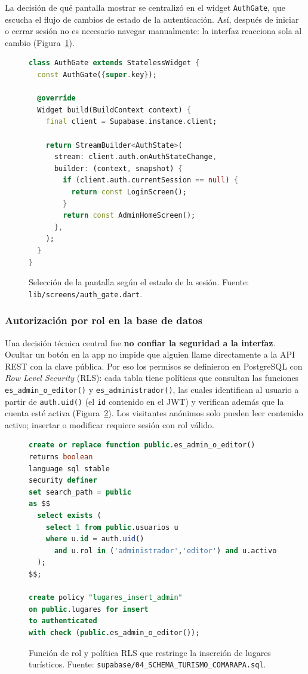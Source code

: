 La decisión de qué pantalla mostrar se centralizó en el widget
\texttt{AuthGate}, que escucha el flujo de cambios de estado de la
autenticación. Así, después de iniciar o cerrar sesión no es necesario
navegar manualmente: la interfaz reacciona sola al cambio
(Figura~\ref{fig:impl-authgate}).

\begin{figure}[H]
\begin{lstlisting}[style=codigo,language=Dart]
class AuthGate extends StatelessWidget {
  const AuthGate({super.key});

  @override
  Widget build(BuildContext context) {
    final client = Supabase.instance.client;

    return StreamBuilder<AuthState>(
      stream: client.auth.onAuthStateChange,
      builder: (context, snapshot) {
        if (client.auth.currentSession == null) {
          return const LoginScreen();
        }
        return const AdminHomeScreen();
      },
    );
  }
}
\end{lstlisting}
\caption{Selección de la pantalla según el estado de la sesión.
Fuente: \texttt{lib/screens/auth\_gate.dart}.}
\label{fig:impl-authgate}
\end{figure}

\subsubsection*{Autorización por rol en la base de datos}

Una decisión técnica central fue \textbf{no confiar la seguridad a la
interfaz}. Ocultar un botón en la app no impide que alguien llame
directamente a la API REST con la clave pública. Por eso los permisos
se definieron en PostgreSQL con \emph{Row Level Security} (RLS): cada
tabla tiene políticas que consultan las funciones
\texttt{es\_admin\_o\_editor()} y \texttt{es\_administrador()}, las
cuales identifican al usuario a partir de \texttt{auth.uid()} (el
\texttt{id} contenido en el JWT) y verifican además que la cuenta esté
activa (Figura~\ref{fig:impl-rls}). Los visitantes anónimos solo pueden
leer contenido activo; insertar o modificar requiere sesión con rol
válido.

\begin{figure}[H]
\begin{lstlisting}[style=codigo,language=SQL]
create or replace function public.es_admin_o_editor()
returns boolean
language sql stable
security definer
set search_path = public
as $$
  select exists (
    select 1 from public.usuarios u
    where u.id = auth.uid()
      and u.rol in ('administrador','editor') and u.activo
  );
$$;

create policy "lugares_insert_admin"
on public.lugares for insert
to authenticated
with check (public.es_admin_o_editor());
\end{lstlisting}
\caption{Función de rol y política RLS que restringe la inserción de
lugares turísticos. Fuente: \texttt{supabase/04\_SCHEMA\_TURISMO\_COMARAPA.sql}.}
\label{fig:impl-rls}
\end{figure}

